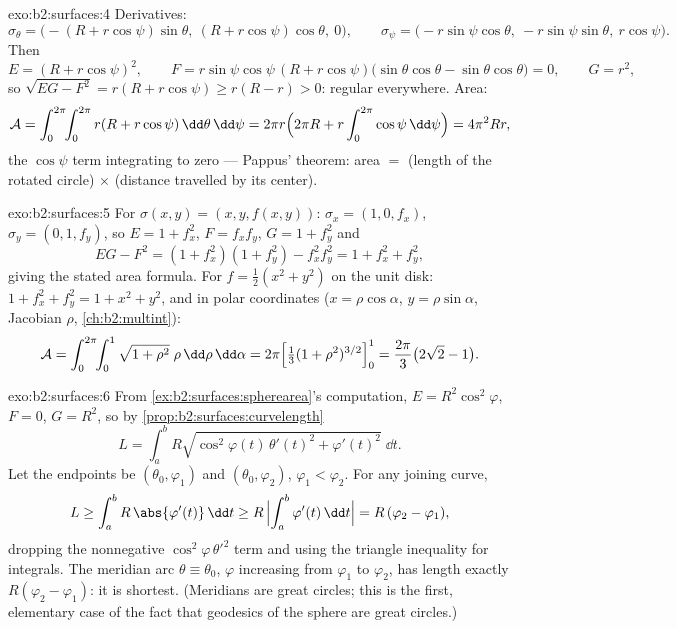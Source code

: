 \begin{solution}{exo:b2:surfaces:4}
Derivatives:
\[
\sigma_\theta = \bigl(-(R + r\cos\psi)\sin\theta,\
(R + r\cos\psi)\cos\theta,\ 0\bigr),
\qquad
\sigma_\psi = \bigl(-r\sin\psi\cos\theta,\
-r\sin\psi\sin\theta,\ r\cos\psi\bigr).
\]
Then
\[
E = (R + r\cos\psi)^2,
\qquad
F = r\sin\psi\cos\psi\,(R + r\cos\psi)
\bigl(\sin\theta\cos\theta - \sin\theta\cos\theta\bigr) = 0,
\qquad
G = r^2 ,
\]
so $\sqrt{EG - F^2} = r(R + r\cos\psi) \geq r(R - r) > 0$:
regular everywhere. Area:
\[
\mathcal{A}
= \int_0^{2\pi}\!\!\int_0^{2\pi} r(R + r\cos\psi)
\,\dd\theta\,\dd\psi
= 2\pi r \Bigl(2\pi R + r\int_0^{2\pi}\cos\psi\,\dd\psi\Bigr)
= 4\pi^2 R r ,
\]
the $\cos\psi$ term integrating to zero --- Pappus' theorem: area
$=$ (length of the rotated circle) $\times$ (distance travelled by
its center).
\end{solution}

\begin{solution}{exo:b2:surfaces:5}
For $\sigma(x, y) = (x, y, f(x,y))$: $\sigma_x = (1, 0, f_x)$,
$\sigma_y = (0, 1, f_y)$, so $E = 1 + f_x^2$, $F = f_xf_y$, $G = 1
+ f_y^2$ and
\[
EG - F^2 = (1 + f_x^2)(1 + f_y^2) - f_x^2f_y^2
= 1 + f_x^2 + f_y^2 ,
\]
giving the stated area formula. For $f = \frac12(x^2 + y^2)$ on
the unit disk: $1 + f_x^2 + f_y^2 = 1 + x^2 + y^2$, and in polar
coordinates ($x = \rho\cos\alpha$, $y = \rho\sin\alpha$, Jacobian
$\rho$, \cref{ch:b2:multint}):
\[
\mathcal{A}
= \int_0^{2\pi}\!\!\int_0^1 \sqrt{1 + \rho^2}\;\rho
\,\dd\rho\,\dd\alpha
= 2\pi\Bigl[\tfrac13(1 + \rho^2)^{3/2}\Bigr]_0^1
= \frac{2\pi}{3}\bigl(2\sqrt2 - 1\bigr).
\]
\end{solution}

\begin{solution}{exo:b2:surfaces:6}
From \cref{ex:b2:surfaces:spherearea}'s computation, $E =
R^2\cos^2\varphi$, $F = 0$, $G = R^2$, so by
\cref{prop:b2:surfaces:curvelength}
\[
L = \int_a^b R\sqrt{\cos^2\varphi(t)\,\theta'(t)^2
+ \varphi'(t)^2}\;\dd t .
\]
Let the endpoints be $(\theta_0, \varphi_1)$ and $(\theta_0,
\varphi_2)$, $\varphi_1 < \varphi_2$. For any joining curve,
\[
L \geq \int_a^b R\,\abs{\varphi'(t)}\,\dd t
\geq R\,\Bigl|\int_a^b \varphi'(t)\,\dd t\Bigr|
= R\,(\varphi_2 - \varphi_1),
\]
dropping the nonnegative $\cos^2\varphi\,\theta'^2$ term and using
the triangle inequality for integrals. The meridian arc
$\theta \equiv \theta_0$, $\varphi$ increasing from $\varphi_1$ to
$\varphi_2$, has length exactly $R(\varphi_2 - \varphi_1)$: it is
shortest. (Meridians are great circles; this is the first,
elementary case of the fact that geodesics of the sphere are great
circles.)
\end{solution}

